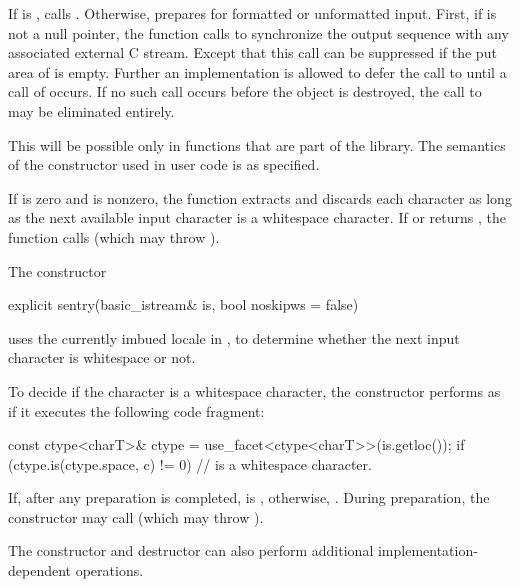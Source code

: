 \begin{itemdescr}
\pnum
\effects
If
is
,
calls . Otherwise,
prepares for formatted or
unformatted input.
First, if
is not a null pointer, the
function calls
%
to synchronize the output sequence with any associated external
C stream.
Except that this call can be suppressed if the put area of
is empty.
Further an implementation is allowed to defer the call to
until a
call of
occurs.
If no such call occurs before the
object is destroyed, the call to
may be eliminated entirely.
\begin{footnote}
This will be possible only in functions
that are part of the library.
The semantics of the constructor used in user code is as specified.
\end{footnote}
If  is zero and
is nonzero, the function extracts and discards each character as long as
the next available input character  is a whitespace character.
If
or
returns
,
the function calls
(which may throw
).

\pnum
\remarks
The constructor
\begin{codeblock}
explicit sentry(basic_istream& is, bool noskipws = false)
\end{codeblock}
uses the currently imbued locale in ,
to determine whether the next input character is
whitespace or not.

\pnum
To decide if the character  is a whitespace character,
the constructor performs as if it executes the following code fragment:
\begin{codeblock}
const ctype<charT>& ctype = use_facet<ctype<charT>>(is.getloc());
if (ctype.is(ctype.space, c) != 0)
  //  is a whitespace character.
\end{codeblock}

\pnum
If, after any preparation is completed,
is
,
otherwise,
.
During preparation, the constructor may call
(which may throw
).
\begin{footnote}
The
constructor and destructor
can also perform additional
%
implementation-dependent operations.
\end{footnote}
\end{itemdescr}

